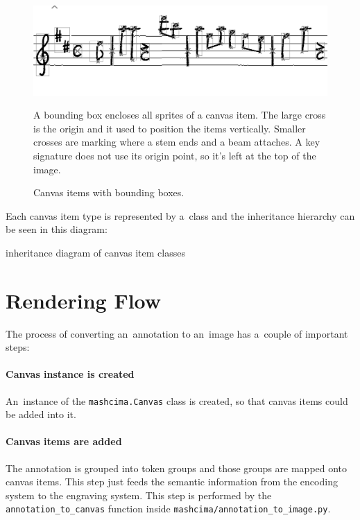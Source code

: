 \begin{figure}[h]
    \centering
    \includegraphics[width=140mm]{../img/canvas-items}
    \caption{Canvas items with bounding boxes.}
    \label{fig5:CanvasItems}
    \medskip
    \small
    A bounding box encloses all sprites of a canvas item. The large cross is the origin and it used to position the items vertically. Smaller crosses are marking where a stem ends and a beam attaches. A key signature does not use its origin point, so it's left at the top of the image.
\end{figure}

Each canvas item type is represented by a~class and the inheritance hierarchy can be seen in this diagram:

\begin{code}
inheritance diagram of canvas item classes
\end{code}


\section{Rendering Flow}

The process of converting an~annotation to an~image has a~couple of important steps:

\paragraph{Canvas instance is created} An~instance of the \verb`mashcima.`\allowbreak\verb`Canvas` class is created, so that canvas items could be added into it.

\paragraph{Canvas items are added} The annotation is grouped into token groups and those groups are mapped onto canvas items. This step just feeds the semantic information from the encoding system to the engraving system. This step is performed by the \verb`annotation_`\allowbreak\verb`to_canvas` function inside \verb`mashcima/`\allowbreak\verb`annotation_`\allowbreak\verb`to_image.py`.
\\


